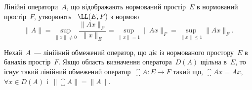 \begin{definition}
Лінійні оператори~$A$, що відображають
нормований простір~$E$ в нормований простір~$F$, утворюють
~$\LL(E, F)$ з нормою
\begin{equation*}
    \|A\| = \sup_{\|x\| \ne 0} \frac{\|A x\|_F}{\|x\|_E} =
    \sup_{\|x\| = 1} \|A x\|_F = \sup_{\|x\| \le 1} \|Ax\|_F.
\end{equation*}
\end{definition}

\begin{theorem}
Нехай~$A$~--- лінійний обмежений оператор,
що діє із нормованого простору~$E$ в банахів простір~$F$. Якщо
область визначення оператора~$D(A)$ щільна в~$E$, то існує
такий лінійний обмежений оператор~$\closure A: E \to F$ такий що,
$\closure A x = A x$,~$\forall x \in D(A)$ і~$\|\closure A\| = \|A\|$.
\end{theorem}

